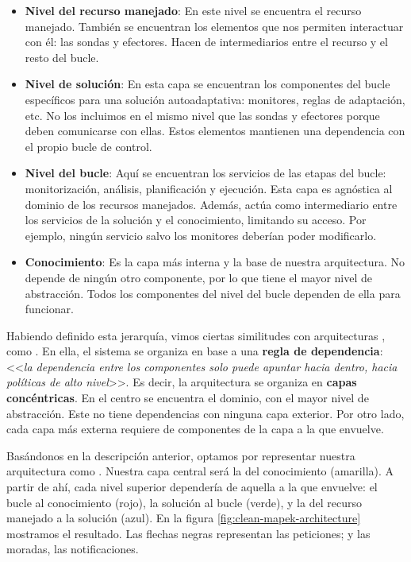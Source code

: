 \begin{itemize}
  \item \textbf{Nivel del recurso manejado}: En este nivel se encuentra el recurso manejado. También se encuentran los elementos que nos permiten interactuar con él: las sondas y efectores. Hacen de intermediarios entre el recurso y el resto del bucle.

  \item \textbf{Nivel de solución}: En esta capa se encuentran los componentes del bucle específicos para una solución autoadaptativa: monitores, reglas de adaptación, etc. No los incluimos en el mismo nivel que las sondas y efectores porque deben comunicarse con ellas. Estos elementos mantienen una dependencia con el propio bucle de control.

  \item \textbf{Nivel del bucle}: Aquí se encuentran los servicios de las etapas del bucle: monitorización, análisis, planificación y ejecución. Esta capa es agnóstica al dominio de los recursos manejados. Además, actúa como intermediario entre los servicios de la solución y el conocimiento, limitando su acceso. Por ejemplo, ningún servicio salvo los monitores deberían poder modificarlo.

  \item \textbf{Conocimiento}: Es la capa más interna y la base de nuestra arquitectura. No depende de ningún otro componente, por lo que tiene el mayor nivel de abstracción. Todos los componentes del nivel del bucle dependen de ella para funcionar.

\end{itemize}

Habiendo definido esta jerarquía, vimos ciertas similitudes con arquitecturas , como . \cite{martinChapter22Clean2018a} En ella, el sistema se organiza en base a una \textbf{regla de dependencia}: <<\emph{la dependencia entre los componentes solo puede apuntar hacia dentro, hacia políticas de alto nivel}>>. Es decir, la arquitectura se organiza en \textbf{capas concéntricas}. En el centro se encuentra el dominio, con el mayor nivel de abstracción. Este no tiene dependencias con ninguna capa exterior. Por otro lado, cada capa más externa requiere de componentes de la capa a la que envuelve.

Basándonos en la descripción anterior, optamos por representar nuestra arquitectura como . \cite{taylorSoftwareArchitectureFoundations2009} Nuestra capa central será la del conocimiento (amarilla). A partir de ahí, cada nivel superior dependería de aquella a la que envuelve: el bucle al conocimiento (rojo), la solución al bucle (verde), y la del recurso manejado a la solución (azul). En la figura \ref{fig:clean-mapek-architecture} mostramos el resultado. Las flechas negras representan las peticiones; y las moradas, las notificaciones.

